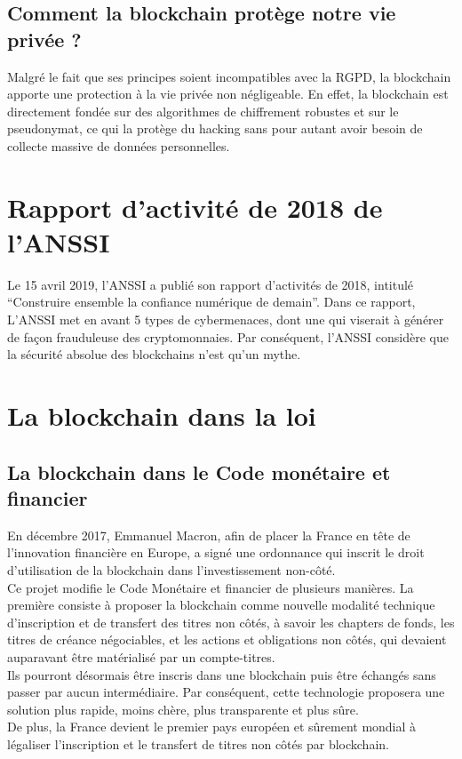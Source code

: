 \documentclass[12pt, a4paper, oneside]{book}
\begin{document}
    \subsection{Comment la blockchain protège notre vie privée ?}

    Malgré le fait que ses principes 
     soient incompatibles avec la RGPD, la blockchain apporte une protection à la vie privée non négligeable. 
     En effet, la blockchain est directement fondée sur des algorithmes de chiffrement robustes et sur le pseudonymat,
     ce qui la protège du hacking sans pour autant avoir besoin de collecte massive de données personnelles.
     \cite{reg}

    \section{Rapport d'activité de 2018 de l'ANSSI}

    Le 15 avril 2019, l'ANSSI a publié son rapport d'activités de 2018, intitulé \hyphenquote{french}{Construire ensemble la confiance 
    numérique de demain}. 
    Dans ce rapport, L'ANSSI met en avant 5 types de cybermenaces, dont une qui viserait à générer de façon frauduleuse des 
    cryptomonnaies. Par conséquent, l'ANSSI considère que la sécurité absolue des blockchains n'est qu'un mythe.
    \cite{anssi2018}

    \section{La blockchain dans la loi}

    \subsection{La blockchain dans le Code monétaire et \\financier}

    En décembre 2017, Emmanuel Macron, afin de placer la France en tête de l'innovation financière en Europe, 
    a signé une ordonnance qui inscrit le droit d'utilisation de la blockchain dans l'investissement non-côté.
    \\
    \newline
    Ce projet modifie le Code Monétaire et financier de plusieurs manières. La première consiste à proposer la blockchain comme nouvelle 
    modalité technique d'inscription et de transfert des titres non côtés, à savoir les chapters de fonds, les titres de créance négociables,
    et les actions et obligations non côtés, qui devaient auparavant être matérialisé par un compte-titres.
    \\
    \newline
    Ils pourront désormais être inscris dans une blockchain puis être échangés sans passer par aucun intermédiaire.
    Par conséquent, cette technologie proposera une solution plus rapide, moins chère, plus transparente et plus sûre.
    \\
    \newline
    De plus, la France devient le premier pays européen et sûrement mondial à légaliser l'inscription et le transfert de titres non côtés par blockchain.
    \cite{CodeMonetaireFinancier}
\end{document}
